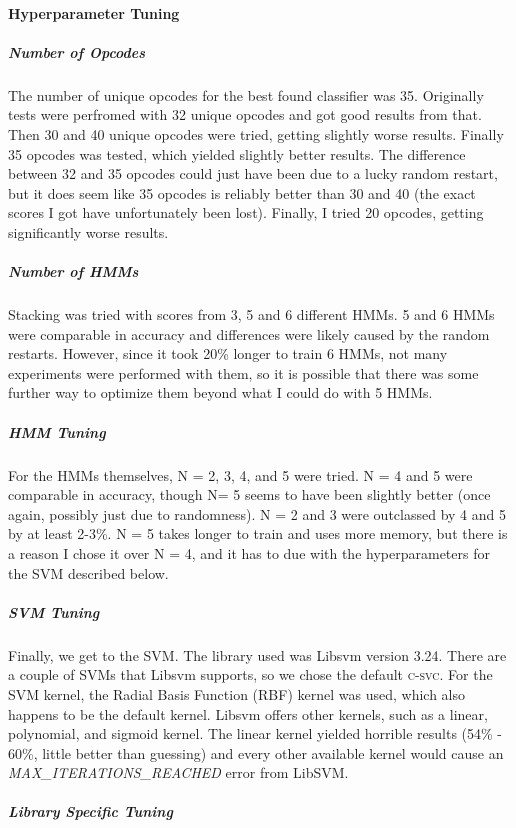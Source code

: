 \documentclass[12pt]{article}
\begin{document}
\paragraph{Hyperparameter Tuning}
  \subparagraph{Number of Opcodes}
  The number of unique opcodes for the best found classifier was 35. Originally tests were perfromed with 32 unique opcodes and got good results from that. Then 30 and 40 unique opcodes were tried, getting slightly worse results. Finally 35 opcodes was tested, which yielded slightly better results. The difference between 32 and 35 opcodes could just have been due to a lucky random restart, but it does seem like 35 opcodes is reliably better than 30 and 40 (the exact scores I got have unfortunately been lost). Finally, I tried 20 opcodes, getting significantly worse results.
  \subparagraph{Number of HMMs}
  Stacking was tried with scores from 3, 5 and 6 different HMMs. 5 and 6 HMMs were comparable in accuracy and differences were likely caused by the random restarts. However, since it took 20\% longer to train 6 HMMs, not many experiments were performed with them, so it is possible that there was some further way to optimize them beyond what I could do with 5 HMMs.
  \subparagraph{HMM Tuning}
 For the HMMs themselves, N = 2, 3, 4, and 5 were tried. N = 4 and 5 were comparable in accuracy, though N= 5 seems to have been slightly better (once again, possibly just due to randomness). N = 2 and 3 were outclassed by 4 and 5 by at least 2-3\%. N = 5 takes longer to train and uses more memory, but there is a reason I chose it over N = 4, and it has to due with the hyperparameters for the SVM described below.
  \subparagraph{SVM Tuning}
  Finally, we get to the SVM. The library used was Libsvm version 3.24. There are a couple of SVMs that Libsvm supports, so we chose the default \textsc{c-svc}. For the SVM kernel, the Radial Basis Function (RBF) kernel was used, which also happens to be the default kernel. Libsvm offers other kernels, such as a linear, polynomial, and sigmoid kernel. The linear kernel yielded horrible results (54\% - 60\%, little better than guessing) and every other available kernel would cause an \textit{MAX\_ITERATIONS\_REACHED} error from LibSVM.
  \subparagraph{Library Specific Tuning}
\end{document}
